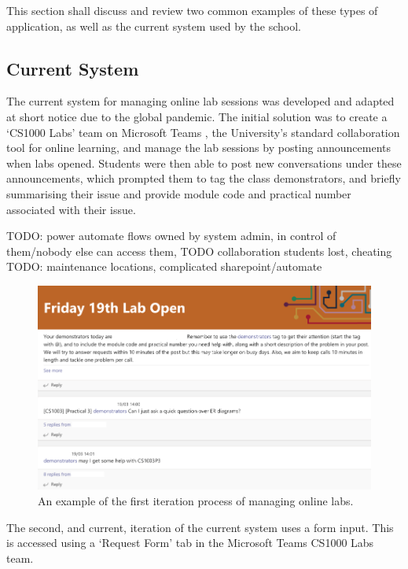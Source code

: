 \documentclass[a4paper,11pt]{article}
\begin{document}
This section shall discuss and review two common examples of these types of application, as well as the current system used by the school.

\subsection{Current System}

The current system for managing online lab sessions was developed and adapted at short notice due to the global pandemic. The initial solution was to create a `CS1000 Labs' team on Microsoft Teams \cite{teams}, the University's standard collaboration tool for online learning, and manage the lab sessions by posting announcements when labs opened. Students were then able to post new conversations under these announcements, which prompted them to tag the class demonstrators, and briefly summarising their issue and provide module code and practical number associated with their issue.

TODO: power automate flows owned by system admin, in control of them/nobody else can access them,
TODO collaboration students lost, cheating
TODO: maintenance locations, complicated sharepoint/automate

\FloatBarrier
\begin{figure}[H]
  \centering
  \includegraphics[width=\textwidth]{teams1.png}
  \caption{An example of the first iteration process of managing online labs.}
\end{figure}

The second, and current, iteration of the current system uses a form input. This is accessed using a `Request Form' tab in the Microsoft Teams \cite{teams} CS1000 Labs team. 
\end{document}
